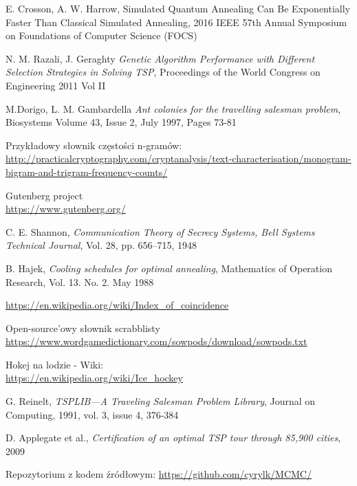\documentclass[a4paper]{article}
\theoremstyle{defn}
\theoremstyle{theorem}
\theoremstyle{lemma}
\theoremstyle{cor}
\theoremstyle{fact}
\begin{document}
\begin{thebibliography}{9}
E. Crosson, A. W. Harrow, {Simulated Quantum Annealing Can Be Exponentially Faster Than Classical Simulated Annealing},
2016 IEEE 57th Annual Symposium on Foundations of Computer Science (FOCS)


N. M. Razali, J. Geraghty \emph{Genetic Algorithm Performance with Different
Selection Strategies in Solving TSP},
Proceedings of the World Congress on Engineering 2011 Vol II

M.Dorigo, L. M. Gambardella \emph{Ant colonies for the travelling salesman problem}, Biosystems
Volume 43, Issue 2, July 1997, Pages 73-81


Przykładowy słownik częstości n-gramów:\\
\href{http://practicalcryptography.com/cryptanalysis/text-characterisation/monogram-bigram-and-trigram-frequency-counts/}{http://practicalcryptography.com/cryptanalysis/text-characterisation/monogram-bigram-and-trigram-frequency-counts/}

Gutenberg project\\
\href{https://www.gutenberg.org/}{https://www.gutenberg.org/}

C. E. Shannon, \emph{Communication Theory of Secrecy Systems, Bell Systems Technical Journal}, Vol. 28, pp. 656–715, 1948

B. Hajek, \emph{Cooling schedules for optimal annealing},
Mathematics of Operation Research, Vol. 13. No. 2. May 1988

\href{https://en.wikipedia.org/wiki/Index\_of\_coincidence}{https://en.wikipedia.org/wiki/Index\_of\_coincidence}

Open-source'owy słownik scrabblisty\\
\href{https://www.wordgamedictionary.com/sowpods/download/sowpods.txt}{https://www.wordgamedictionary.com/sowpods/download/sowpods.txt}

Hokej na lodzie - Wiki:\\
\href{https://en.wikipedia.org/wiki/Ice\_hockey}{https://en.wikipedia.org/wiki/Ice\_hockey}

G. Reinelt, \emph{TSPLIB—A Traveling Salesman Problem Library}, Journal on Computing, 1991, vol. 3, issue 4, 376-384

D. Applegate  et al.,  \emph{Certification of an optimal TSP tour through 85,900 cities}, 2009

Repozytorium z kodem źródłowym:
\href{https://github.com/cyrylk/MCMC/}{https://github.com/cyrylk/MCMC/}

\end{thebibliography}
\end{document}
